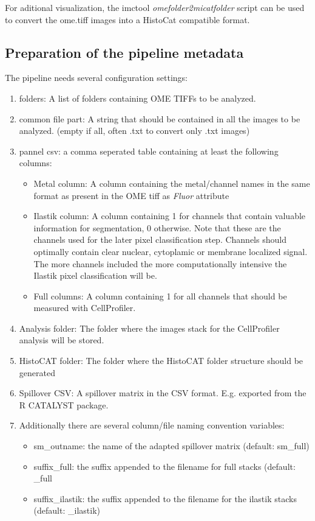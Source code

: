 \documentclass[a4paper]{article}
\begin{document}
For aditional visualization, the imctool \textit{omefolder2micatfolder} script can be used to convert the
ome.tiff images into a HistoCat compatible format.

\subsection{Preparation of the pipeline metadata}
The pipeline needs several configuration settings:
\begin{enumerate}
\item folders: A  list of folders containing OME TIFFs to be analyzed.
\item common file part: A string that should be contained in all the images to be analyzed. (empty
if all, often .txt to convert only .txt images)
\item pannel csv: a comma seperated table containing at least the following columns:

\begin{itemize}
\item Metal column: A column containing the metal/channel names in the same format as present in
	the OME tiff as \textit{Fluor} attribute
\item Ilastik column: A column containing 1 for channels that contain valuable information for
segmentation, 0 otherwise. Note that these are the channels used for the later pixel classification
step. Channels should optimally contain clear nuclear, cytoplamic or membrane localized signal. The
more channels included the more computationally intensive the Ilastik pixel classification will be.
\item Full columns: A column containing 1 for all channels that should be measured with
CellProfiler.
\end{itemize}

\item Analysis folder: The folder where the images stack for the CellProfiler analysis will be
stored.
\item HistoCAT folder: The folder where the HistoCAT folder structure should be generated

\item Spillover CSV: A spillover matrix in the CSV format. E.g. exported from the R CATALYST
package.


\item Additionally there are several column/file naming convention variables:

\begin{itemize}
\item sm\_outname: the name of the adapted spillover matrix (default: sm\_full)
\item suffix\_full: the suffix appended to the filename for full stacks (default: \_full
\item suffix\_ilastik: the suffix appended to the filename for the ilastik stacks (default:
\_ilastik)
\end{itemize}
\end{enumerate}
\end{document}
